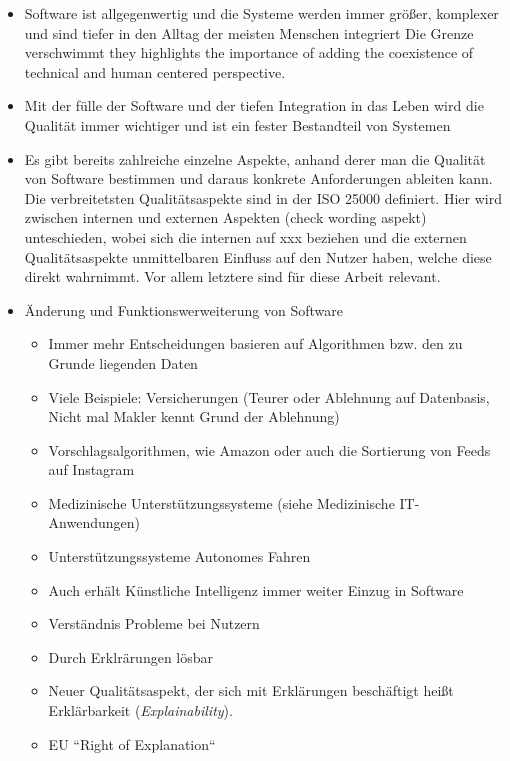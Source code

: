 \begin{itemize}
    \item Software ist allgegenwertig und die Systeme werden immer größer, komplexer und sind tiefer in den Alltag der meisten Menschen integriert \cite{carvalho2020developers} Die Grenze verschwimmt \cite{ehsan_human-centered_2020} they highlights the importance of adding the coexistence of technical and human centered perspective.
    \item Mit der fülle der Software und der tiefen Integration in das Leben wird die Qualität immer wichtiger und ist ein fester Bestandteil von Systemen \cite{schneider2012abenteuer}
    \item Es gibt bereits zahlreiche einzelne Aspekte, anhand derer man die Qualität von Software bestimmen und daraus konkrete Anforderungen ableiten kann. Die verbreitetsten Qualitätsaspekte sind in der ISO 25000 definiert. \cite{international2011iso}
    Hier wird zwischen internen und externen Aspekten (check wording aspekt) unteschieden, wobei sich die internen auf xxx beziehen und die externen Qualitätsaspekte unmittelbaren Einfluss auf den Nutzer haben, welche diese direkt wahrnimmt. Vor allem letztere sind für diese Arbeit relevant.
    \item Änderung und Funktionswerweiterung von Software
    \begin{itemize}
        \item Immer mehr Entscheidungen basieren auf Algorithmen bzw. den zu Grunde liegenden Daten
        \item Viele Beispiele: Versicherungen (Teurer oder Ablehnung auf Datenbasis, Nicht mal Makler kennt Grund der Ablehnung)
        \item Vorschlagsalgorithmen, wie Amazon oder auch die Sortierung von Feeds auf Instagram
        \item Medizinische Unterstützungssysteme \cite{doshi2017towards} (siehe Medizinische IT-Anwendungen)
        \item Unterstützungssysteme Autonomes Fahren
        \item Auch erhält Künstliche Intelligenz immer weiter Einzug in Software
        \item Verständnis Probleme bei Nutzern
        \item Durch Erklrärungen lösbar
        \item Neuer Qualitätsaspekt, der sich mit Erklärungen beschäftigt heißt Erklärbarkeit (\textit{Explainability}).
        \item EU “Right of Explanation“

\end{itemize}
\end{itemize}
